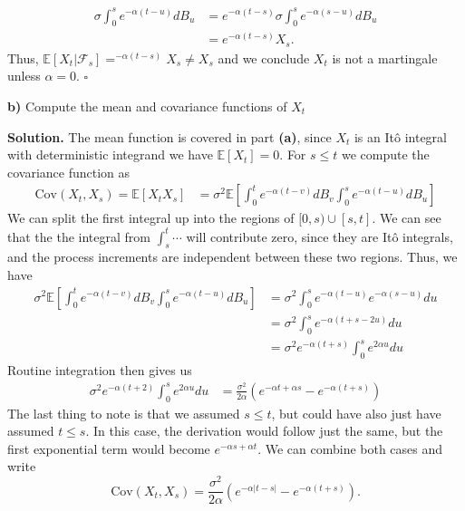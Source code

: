 \documentclass{article}
\begin{document}
\begin{align*}
    \sigma\int_0^s e^{-\alpha (t-u)}dB_u &= e^{-\alpha (t-s)}\sigma\int_0^s e^{-\alpha (s-u)}dB_u \\
    &= e^{-\alpha (t-s)}X_s. 
\end{align*}
Thus, $\mathbb{E}[X_t | \mathcal{F}_s] = ^{-\alpha (t-s)}X_s \neq X_s$ and we conclude $X_t$ is not a martingale unless $\alpha=0$. $\square$
\begin{tcolorbox}
[colframe=black,colback=gray!5,boxrule=0.5pt]
 \textbf{b)} Compute the mean and covariance functions of $X_t$ 
\end{tcolorbox}
\textbf{Solution.} The mean function is covered in part \textbf{(a)}, since $X_t$ is an Itô integral with deterministic integrand we have $\mathbb{E}[X_t] = 0$. For $s\leq t$ we compute the covariance function as 
\begin{align*}
    \text{Cov}(X_t,X_s) = \mathbb{E}[X_t X_s] &= \sigma^2\mathbb{E}\left[\int_0^t e^{-\alpha(t-v)}dB_v\int_0^s e^{-\alpha(t-u)}dB_u\right]
\end{align*}
We can split the first integral up into the regions of $[0,s)\cup [s,t]$. We can see that the the integral from $\int_s^t\cdots$ will contribute zero, since they are Itô integrals, and the process increments are independent between these two regions. Thus, we have 
\begin{align*}
    \sigma^2\mathbb{E}\left[\int_0^t e^{-\alpha(t-v)}dB_v\int_0^s e^{-\alpha(t-u)}dB_u\right] &= \sigma^2 \int_0^s e^{-\alpha(t-u)}e^{-\alpha(s-u)}du \\
    &= \sigma^2\int_0^s e^{-\alpha(t+s-2u)}du \\
    &= \sigma^2e^{-\alpha(t+s)}\int_0^s e^{2\alpha u}du
\end{align*}
Routine integration then gives us 
\begin{align*}
    \sigma^2e^{-\alpha(t+2)}\int_0^s e^{2\alpha u}du &= \frac{\sigma^2}{2\alpha}\left(e^{-\alpha t + \alpha s } - e^{-\alpha(t+s)}\right)
\end{align*}
The last thing to note is that we assumed $s\leq t$, but could have also just have assumed $t\leq s$. In this case, the derivation would follow just the same, but the first exponential term would become $e^{-\alpha s + \alpha t}$. We can combine both cases and write 
$$\text{Cov}(X_t,X_s) = \frac{\sigma^2}{2\alpha}\left(e^{-\alpha |t-s| } - e^{-\alpha(t+s)}\right).$$


\newpage
\end{document}
